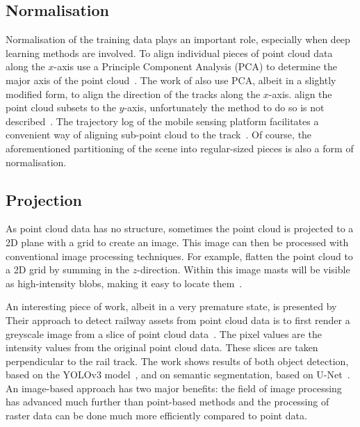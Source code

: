 \subsection{Normalisation}
Normalisation of the training data plays an important role, especially when deep learning methods are involved. To align individual pieces of point cloud data along the $x$-axis \citeauthor{ariyachandra2020detection} use a Principle Component Analysis (PCA) to determine the major axis of the point cloud~\cite{ariyachandra2020detection}. The work of \citeauthor{lamas2021automatic} also use PCA, albeit in a slightly modified form, to align the direction of the tracks along the $x$-axis. \citeauthor{corongiu2020classification} align the point cloud subsets to the $y$-axis, unfortunately the method to do so is not described~\cite{corongiu2020classification}. The trajectory log of the mobile sensing platform facilitates a convenient way of aligning sub-point cloud to the track~\cite{pastucha2016catenary}. Of course, the aforementioned partitioning of the scene into regular-sized pieces is also a form of normalisation.

\subsection{Projection}
As point cloud data has no structure, sometimes the point cloud is projected to a 2D plane with a grid to create an image. This image can then be processed with conventional image processing techniques. For example, \citeauthor{corongiu2020classification} flatten the point cloud to a 2D grid by summing in the $z$-direction. Within this image masts will be visible as high-intensity blobs, making it easy to locate them~\cite{corongiu2020classification}.
\par An interesting piece of work, albeit in a very premature state, is presented by \citeauthor{wolf2021asset} Their approach to detect railway assets from point cloud data is to first render a greyscale image from a slice of point cloud data~\cite{wolf2021asset}. The pixel values are the intensity values from the original point cloud data. These slices are taken perpendicular to the rail track. The work shows results of both object detection, based on the YOLOv3 model~\cite{yolov3}, and on semantic segmentation, based on U-Net~\cite{unet}. An image-based approach has two major benefits: the field of image processing has advanced much further than point-based methods and the processing of raster data can be done much more efficiently compared to point data.

